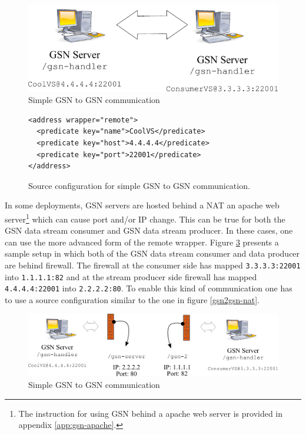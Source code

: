 \begin{figure}%
  \centering
  \includegraphics[width=0.8\columnwidth]{ch-gsn-figures/gsn-comm-no-firewall}
  \caption{Simple GSN to GSN communication}
  \label{gsn2gsn-simple-figure}
\end{figure}


\begin{figure}%
  \centering
  \lstset{numbers=left, numberstyle=\footnotesize}
\begin{lstlisting}
<address wrapper="remote">
  <predicate key="name">CoolVS</predicate>
  <predicate key="host">4.4.4.4</predicate>
  <predicate key="port">22001</predicate>
</address>        
\end{lstlisting}
  \caption{Source configuration for simple GSN to GSN communication.}
  \label{gsn2gsn-simple}
\end{figure}

In some deployments, GSN servers are hosted behind a NAT an apache web server\footnote{The instruction for using GSN behind a apache web server is provided in appendix \ref{app:gsn-apache}.} which can cause port and/or IP change. This can be true for both the GSN data stream consumer and GSN data stream producer.
In these cases, one can use the more advanced form of the remote wrapper. Figure \ref{gsn2gsn-nat-figure} presents a sample setup in which both of the GSN data stream
consumer and data producer are behind firewall. The firewall at the consumer side has mapped \texttt{3.3.3.3:22001} into \texttt{1.1.1.1:82} and at the stream producer side
firewall has mapped \texttt{4.4.4.4:22001} into \texttt{2.2.2.2:80}.  To enable this kind of
communication one has to use a source configuration similar to the one in figure \ref{gsn2gsn-nat}.


\begin{figure}%
  \centering
  \includegraphics[width=0.8\columnwidth]{ch-gsn-figures/gsn-comm-firewall}
  \caption{Simple GSN to GSN communication}
  \label{gsn2gsn-nat-figure}
\end{figure}

